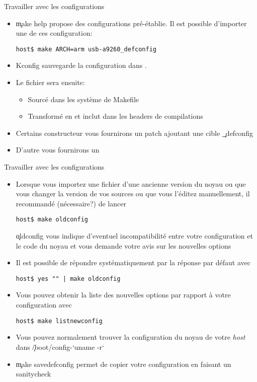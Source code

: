 \begin{frame}[fragile=singleslide]{Travailler avec les configurations}
  \begin{itemize} 
  \item \c{make  help} propose des configurations  pré-établie. Il est
    possible d'importer une de ces configuration:
    \begin{lstlisting} 
host$ make ARCH=arm usb-a9260_defconfig
    \end{lstlisting} 
  \item Kconfig sauvegarde la configuration dans . 
  \item Le fichier  sera ensuite:
    \begin{itemize} 
    \item Sourcé dans les système de Makefile
    \item Transformé  en  et inclut
      dans les headers de compilations
    \end{itemize} 
  \item Certains  constructeur vous  fournirons un patch  ajoutant une
    cible \c{_defconfig}
  \item D'autre vous fournirons un 
\end{itemize} 
\end{frame} 

\begin{frame}[fragile=singleslide]{Travailler avec les configurations}
\begin{itemize} 
  \item  Lorsque  vous   importez  une  fichier    d'une
    ancienne version  du noyau ou que  vous changer la  version de vos
    sources   ou  que  vous   l'éditez  manuellement,   il  recommandé
    (nécessaire?) de lancer
    \begin{lstlisting} 
host$ make oldconfig
    \end{lstlisting} 
    \c{oldconfig} vous indique  d'eventuel incompatibilité entre votre
    configuration et le  code du noyau et vous  demande votre avis sur
    les nouvelles options
  \item Il  est possible de  répondre systématiquement par  la réponse
    par défaut avec
    \begin{lstlisting} 
host$ yes "" | make oldconfig
    \end{lstlisting} 
  \item Vous pouvez obtenir la liste des nouvelles options par rapport
    à votre configuration avec
   \begin{lstlisting} 
host$ make listnewconfig
   \end{lstlisting} 
 \item Vous  pouvez normalement trouver  la configuration du  noyau de
   votre \emph{host} dans \c{/boot/config-`uname -r`}
 \item \c{make  savedefconfig} permet de copier  votre configuration en
   faisant un sanitycheck
 \end{itemize}
\end{frame} 

